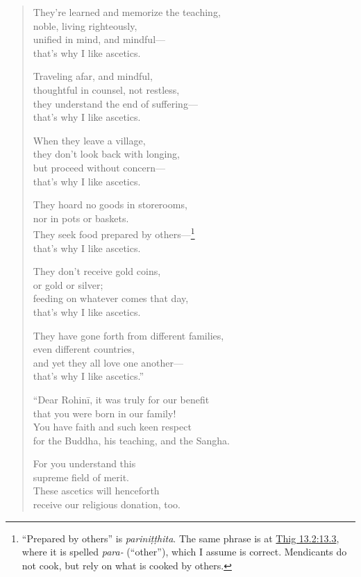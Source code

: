 \documentclass[12pt,openany]{book}%
\begin{document}
\begin{verse}
They’re learned and memorize the teaching, \\
noble, living righteously, \\
unified in mind, and mindful—\\
that’s why I like ascetics. 

Traveling afar, and mindful, \\
thoughtful in counsel, not restless, \\
they understand the end of suffering—\\
that’s why I like ascetics. 

When they leave a village, \\
they don’t look back with longing, \\
but proceed without concern—\\
that’s why I like ascetics. 

They hoard no goods in storerooms, \\
nor in pots or baskets. \\
They seek food prepared by others—\footnote{“Prepared
 by others” is \textit{\textsanskrit{pariniṭṭhita}}. The same phrase is at \href{https://suttacentral.net/thig13.2/en/sujato\#13.3}{Thig 13.2:13.3}, 
where it is spelled \textit{para-} (“other”), which I assume is correct. Mendicants do not cook, but rely on what is cooked by others. } \\
that’s why I like ascetics. 

They don’t receive gold coins, \\
or gold or silver; \\
feeding on whatever comes that day, \\
that’s why I like ascetics. 

They have gone forth from different families, \\
even different countries, \\
and yet they all love one another—\\
that’s why I like ascetics.” 

“Dear \textsanskrit{Rohinī}, it was truly for our benefit \\
that you were born in our family! \\
You have faith and such keen respect \\
for the Buddha, his teaching, and the Sangha. 

For you understand this \\
supreme field of merit. \\
These ascetics will henceforth \\
receive our religious donation, too. 


\end{verse}
\end{document}
